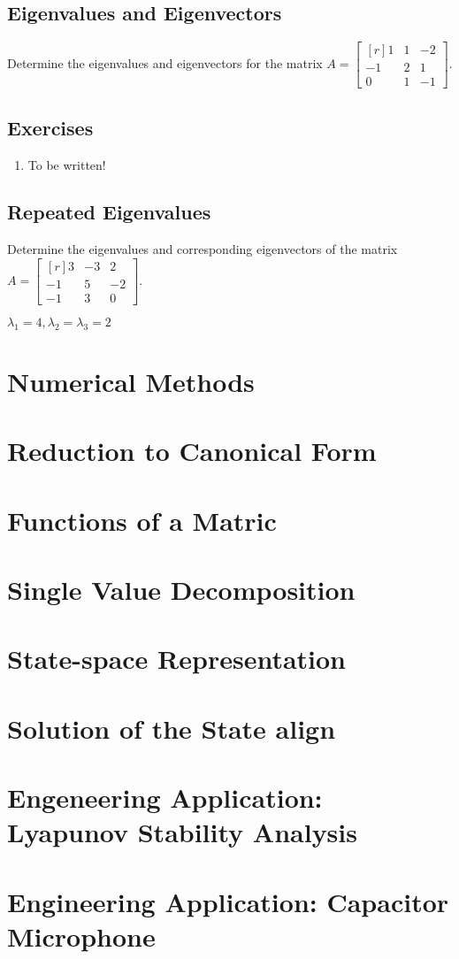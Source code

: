 \documentclass[12pt,a4paper,fleqn]{mycalc}
\begin{document}
	\subsection{Eigenvalues and Eigenvectors}
	\begin{example}
		Determine the eigenvalues and eigenvectors for the matrix $ A=\begin{bmatrix*}[r]
		1 & 1 & -2\\
		-1 & 2 & 1\\
		0 & 1 & -1
		\end{bmatrix*}. $
	\end{example}
	\subsection{Exercises}
	\begin{enumerate}
		\item To be written!
	\end{enumerate}
	\subsection{Repeated Eigenvalues}
	\begin{example}
		Determine the eigenvalues and corresponding eigenvectors of the matrix 
		$ A =\begin{bmatrix*}[r]
		3 & -3 & 2\\
		-1 & 5 & -2\\
		-1 & 3 & 0
		\end{bmatrix*}. $
	\end{example}
	\begin{solution}
		$ \lambda_1=4,\lambda_2=\lambda_3=2 $
	\end{solution}
	\section{Numerical Methods}
	\section{Reduction to Canonical Form}
	\section{Functions of a Matric}
	\section{Single Value Decomposition}
	\section{State-space Representation}
	\section{Solution of the State align}
	\section{Engeneering Application: Lyapunov Stability Analysis}
	\section{Engineering Application: Capacitor Microphone}
\end{document}
